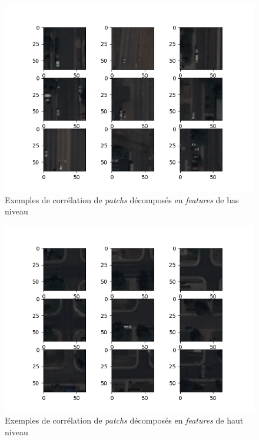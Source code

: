 \documentclass[a4paper, 11pt]{report}
\begin{document}
\begin{figure}[H]
	\begin{center}
		\includegraphics[scale=0.9]{Images/CommerceCity_Correlation_1.png}
		\caption{Exemples de corrélation de \emph{patchs} décomposés en \emph{features} de bas niveau}
	\end{center}
\end{figure}

\begin{figure}[H]
	\begin{center}
		\includegraphics[scale=0.9]{Images/CommerceCity_Correlation_2.png}
		\caption{Exemples de corrélation de \emph{patchs} décomposés en \emph{features} de haut niveau}
	\end{center}
\end{figure}
\end{document}
